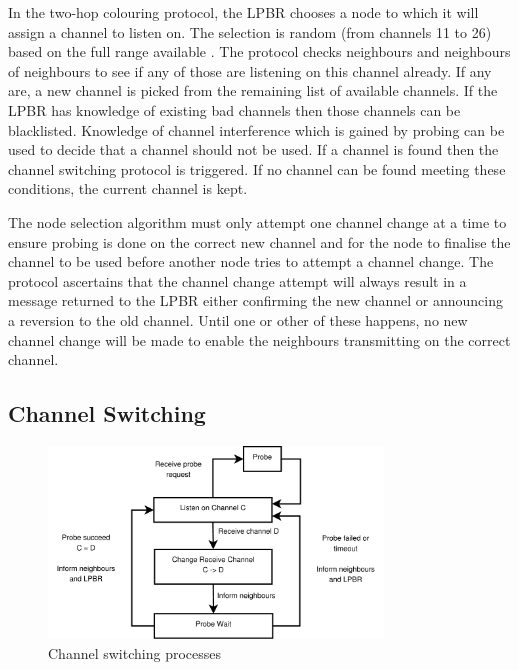 In the two-hop colouring protocol, the LPBR chooses a node to which it will assign a channel to listen on. The selection is random (from channels 11 to 26) based on the full range available \cite{ieee802.15.4}. The protocol checks neighbours and neighbours of neighbours to see if any of those are listening on this channel already. If any are, a new channel is picked from the remaining list of available channels. If the LPBR has knowledge of existing bad channels then those channels can be blacklisted.  Knowledge of channel interference which is gained by probing can be used to decide that a channel should not be used. If a channel is found then the channel switching protocol is triggered. If no channel can be found meeting these conditions, the current channel is kept.  

The node selection algorithm must only attempt one channel change at a time to ensure probing is done on the correct new channel and for the node to finalise the channel to be used before another node tries to attempt a channel change.
The protocol ascertains that the channel change attempt will always result in a message returned to the LPBR either confirming the new channel or announcing a reversion to the old channel. Until one or other of these happens, no new channel change will be made to enable the neighbours transmitting on the correct channel.

\subsection{Channel Switching}
\label{sec:channelswitch}

\begin{figure}
\centering
\includegraphics[width=3.5in]{Diagram1.pdf}
\caption{Channel switching processes}
\label{fig_sim}
\end{figure}

